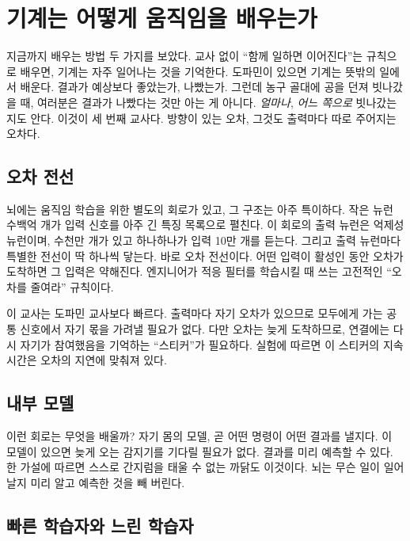 \chapter{기계는 어떻게 움직임을 배우는가}

지금까지 배우는 방법 두 가지를 보았다. 교사 없이 “함께 일하면 이어진다”는 규칙으로 배우면, 기계는 자주 일어나는 것을 기억한다. 도파민이 있으면 기계는 뜻밖의 일에서 배운다. 결과가 예상보다 좋았는가, 나빴는가. 그런데 농구 골대에 공을 던져 빗나갔을 때, 여러분은 결과가 나빴다는 것만 아는 게 아니다. \emph{얼마나}, \emph{어느 쪽으로} 빗나갔는지도 안다. 이것이 세 번째 교사다. 방향이 있는 오차, 그것도 출력마다 따로 주어지는 오차다.

\section*{오차 전선}

뇌에는 움직임 학습을 위한 별도의 회로가 있고, 그 구조는 아주 특이하다. 작은  뉴런 수백억 개가 입력 신호를 아주 긴 특징 목록으로 펼친다. 이 회로의 출력 뉴런은 억제성  뉴런이며, 수천만 개가 있고 하나하나가 입력 10만 개를 듣는다. 그리고 출력 뉴런마다 특별한 전선이 딱 하나씩 닿는다. 바로 오차 전선이다. 어떤 입력이 활성인 동안 오차가 도착하면 그 입력은 약해진다. 엔지니어가 적응 필터를 학습시킬 때 쓰는 고전적인 “오차를 줄여라” 규칙이다.


이 교사는 도파민 교사보다 빠르다. 출력마다 자기 오차가 있으므로 모두에게 가는 공통 신호에서 자기 몫을 가려낼 필요가 없다. 다만 오차는 늦게 도착하므로, 연결에는 다시 자기가 참여했음을 기억하는 “스티커”가 필요하다. 실험에 따르면 이 스티커의 지속 시간은 오차의 지연에 맞춰져 있다.

\section*{내부 모델}

이런 회로는 무엇을 배울까? 자기 몸의 모델, 곧 어떤 명령이 어떤 결과를 낼지다. 이 모델이 있으면 늦게 오는 감지기를 기다릴 필요가 없다. 결과를 미리 예측할 수 있다. 한 가설에 따르면 스스로 간지럼을 태울 수 없는 까닭도 이것이다. 뇌는 무슨 일이 일어날지 미리 알고 예측한 것을 빼 버린다.

\section*{빠른 학습자와 느린 학습자}

